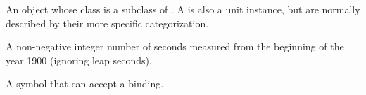 \begin{glossary-list}

%
%
%
%
%
%
%
%
%
An object whose class is a subclass of
. A  is
also a unit instance, but  are normally described by
their more specific categorization.


%
%
A non-negative integer number of seconds measured from the beginning of the
year 1900 (ignoring leap seconds).


%
%
A symbol that can accept a binding.

\end{glossary-list}

